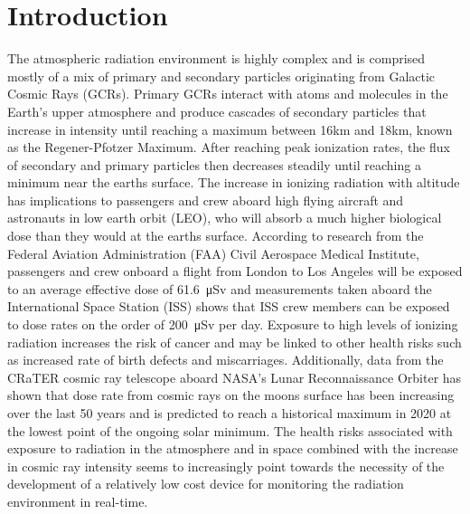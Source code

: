 \section{Introduction}
\label{Introduction}

The atmospheric radiation environment is highly complex and is comprised mostly of a mix of primary and secondary particles originating from Galactic Cosmic Rays (GCRs). Primary GCRs interact with atoms and molecules in the Earth's upper atmosphere and produce cascades of secondary particles that increase in intensity until reaching a maximum between 16km and 18km, known as the Regener-Pfotzer Maximum. After reaching peak ionization rates, the flux of secondary and primary particles then decreases steadily until reaching a minimum near the earths surface. The increase in ionizing radiation with altitude has implications to passengers and crew aboard high flying aircraft and astronauts in low earth orbit (LEO), who will absorb a much higher biological dose than they would at the earths surface. According to research from the Federal Aviation Administration (FAA) Civil Aerospace Medical Institute, passengers and crew onboard a flight from London to Los Angeles will be exposed to an average effective dose of \SI{61.6}{\micro\sievert}\cite{faa} and measurements taken aboard the International Space Station (ISS) shows that ISS crew members can be exposed to dose rates on the order of \SI{200}{\micro\sievert} per day. Exposure to high levels of ionizing radiation increases the risk of cancer and may be linked to other health risks such as increased rate of birth defects and miscarriages\cite{flightatt}. 
Additionally, data from the CRaTER cosmic ray telescope aboard NASA’s Lunar Reconnaissance Orbiter has shown that dose rate from cosmic rays on the moons surface has been increasing over the last 50 years and is predicted to reach a historical maximum in 2020 at the lowest point of the ongoing solar minimum\cite{crater}. The health risks associated with exposure to radiation in the atmosphere and in space combined with the increase in cosmic ray intensity seems to increasingly point towards the necessity of the development of a relatively low cost device for monitoring the radiation environment in real-time.


